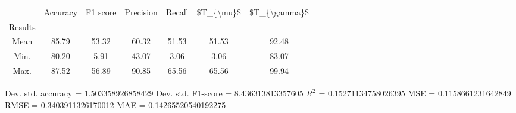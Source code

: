 \begin{tabular}{|c|c|c|c|c|c|c|}
\toprule
{} &  Accuracy &  F1 score &  Precision &  Recall &  \$T\_\{\textbackslash mu\}\$ &  \$T\_\{\textbackslash gamma\}\$ \\
Results &           &           &            &         &            &               \\
\hline
Mean    &     85.79 &     53.32 &      60.32 &   51.53 &      51.53 &         92.48 \\
Min.    &     80.20 &      5.91 &      43.07 &    3.06 &       3.06 &         83.07 \\
Max.    &     87.52 &     56.89 &      90.85 &   65.56 &      65.56 &         99.94 \\
\bottomrule
\end{tabular}

 Dev. std. accuracy = 1.503358926858429
 Dev. std. F1-score = 8.436313813357605
 $R^2$ = 0.15271134758026395
 MSE = 0.1158661231642849
 RMSE = 0.3403911326170012
 MAE = 0.14265520540192275